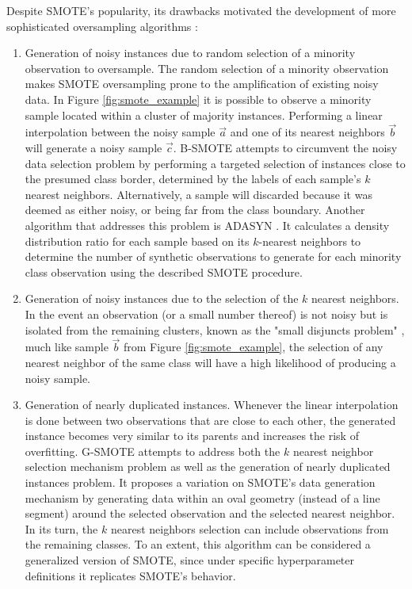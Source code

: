 \documentclass[parskip=full]{scrartcl}
\begin{document}
Despite SMOTE's popularity, its drawbacks motivated the development of more
sophisticated oversampling algorithms \cite{Douzas2019}:
\begin{enumerate}
	\item Generation of noisy instances due to random selection of a minority observation
	      to oversample. The random selection of a minority observation makes SMOTE
	      oversampling prone to the amplification of existing noisy data. In Figure
	      \ref{fig:smote_example} it is possible to observe a minority sample located
	      within a cluster of majority instances. Performing a linear interpolation
	      between the noisy sample $\overrightarrow{a}$ and one of its nearest neighbors
	      $\overrightarrow{b}$ will generate a noisy sample $\overrightarrow{c}$.
	      B-SMOTE \cite{Han2005} attempts to circumvent the noisy data selection
	      problem by performing a targeted selection of instances close to the presumed
	      class border, determined by the labels of each sample's $k$
	      nearest neighbors. Alternatively, a sample will discarded because it was deemed
	      as either noisy, or being far from the class boundary. Another algorithm that
	      addresses this problem is ADASYN \cite{HaiboHe2008}. It calculates a
	      density distribution ratio for each sample based on its
	      $k$-nearest neighbors to determine the number of synthetic
	      observations to generate for each minority class observation using the
	      described SMOTE procedure.

	\item Generation of noisy instances due to the selection of the $k$
	      nearest neighbors. In the event an observation (or a small number thereof) is
	      not noisy but is isolated from the remaining clusters, known as the "small
	      disjuncts problem" \cite{holte1989}, much like sample
	      $\overrightarrow{b}$ from Figure \ref{fig:smote_example}, the selection of any
	      nearest neighbor of the same class will have a high likelihood of producing a
	      noisy sample.

	\item Generation of nearly duplicated instances. Whenever the linear interpolation is
	      done between two observations that are close to each other, the generated
	      instance becomes very similar to its parents and increases the risk of
	      overfitting. G-SMOTE \cite{Douzas2019} attempts to address both the
	      $k$ nearest neighbor selection mechanism problem as well as
	      the generation of nearly duplicated instances problem. It proposes a variation
	      on SMOTE's data generation mechanism by generating data within an oval geometry
	      (instead of a line segment) around the selected observation and the selected
	      nearest neighbor. In its turn, the $k$ nearest neighbors
	      selection can include observations from the remaining classes. To an extent,
	      this algorithm can be considered a generalized version of SMOTE, since under
	      specific hyperparameter definitions it replicates SMOTE's behavior.


\end{enumerate}
\end{document}
